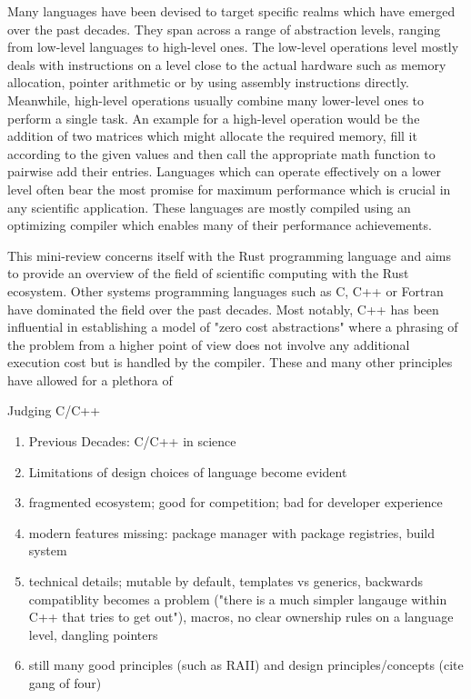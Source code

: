 \documentclass{article}
\begin{document}
Many languages have been devised to target specific realms which have emerged over the past decades.
They span across a range of abstraction levels, ranging from low-level languages to high-level ones.
The low-level operations level mostly deals with instructions on a level close to the actual
hardware such as memory allocation, pointer arithmetic or by using assembly instructions directly.
Meanwhile, high-level operations usually combine many lower-level ones to perform a single task.
An example for a high-level operation would be the addition of two matrices which might allocate the
required memory, fill it according to the given values and then call the appropriate math function
to pairwise add their entries.
Languages which can operate effectively on a lower level often bear the most promise for maximum
performance which is crucial in any scientific application.
These languages are mostly compiled using an optimizing compiler which enables many of their
performance achievements.

This mini-review concerns itself with the Rust programming language and aims to provide an overview
of the field of scientific computing with the Rust ecosystem.
Other systems programming languages  such as C, C++ or Fortran have dominated the field over the
past decades.
Most notably, C++ has been influential in establishing a model of "zero cost abstractions" where a
phrasing of the problem from a higher point of view does not involve any additional execution cost
but is handled by the compiler.
These and many other principles have allowed for a plethora of 

Judging C/C++
\begin{enumerate}
    \item Previous Decades: C/C++ in science
    \item Limitations of design choices of language become evident
    \item fragmented ecosystem; good for competition; bad for developer experience
    \item modern features missing: package manager with package registries, build system
    \item technical details; mutable by default, templates vs generics, backwards
        compatiblity becomes a
        problem ("there is a much simpler langauge within C++ that tries to get out"),
        macros, no clear
        ownership rules on a language level, dangling pointers
    \item still many good principles (such as RAII) and design principles/concepts (cite
        gang of four)
\end{enumerate}
\end{document}
